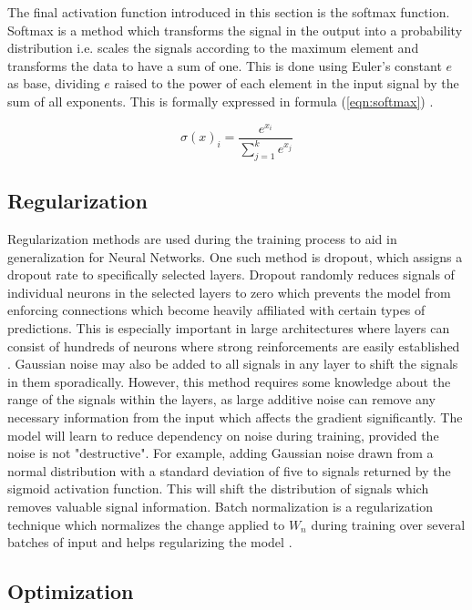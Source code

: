 The final activation function introduced in this section is the softmax function. Softmax is a method which transforms the signal in the output into a probability distribution i.e. scales the signals according to the maximum element and transforms the data to have a sum of one. This is done using Euler's constant $e$ as base, dividing $e$ raised to the power of each element in the input signal by the sum of all exponents. This is formally expressed in formula (\ref{eqn:softmax}) \cite{misra2019mish}.

\begin{equation}
\label{eqn:softmax}
\sigma(x)_i = \frac{e^{x_i}}{\sum_{j=1}^k e^{x_j}}
\end{equation}

\subsection{Regularization}
Regularization methods are used during the training process to aid in generalization for Neural Networks. One such method is dropout, which assigns a dropout rate to specifically selected layers. Dropout randomly reduces signals of individual neurons in the selected layers to zero which prevents the model from enforcing connections which become heavily affiliated with certain types of predictions. This is especially important in large architectures where layers can consist of hundreds of neurons where strong reinforcements are easily established \cite{srivastava2013improving}. Gaussian noise may also be added to all signals in any layer to shift the signals in them sporadically. However, this method requires some knowledge about the range of the signals within the layers, as large additive noise can remove any necessary information from the input which affects the gradient significantly. The model will learn to reduce dependency on noise during training, provided the noise is not "destructive". For example, adding Gaussian noise drawn from a normal distribution with a standard deviation of five to signals returned by the sigmoid activation function. This will shift the distribution of signals which removes valuable signal information. Batch normalization is a regularization technique which normalizes the change applied to $W_n$ during training over several batches of input and helps  regularizing the model \cite{santurkar2018does}.

\subsection{Optimization}

